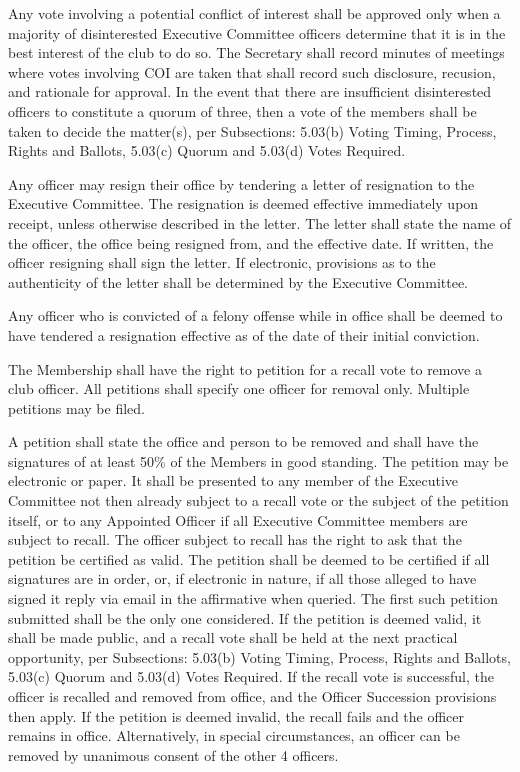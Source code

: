 \documentclass{bylaws}
\begin{document}
Any vote involving a potential conflict of interest shall be approved only when a majority of disinterested Executive Committee officers determine that it is in the best interest of the club to do so. The Secretary shall record minutes of meetings where votes involving COI are taken that shall record such disclosure, recusion, and rationale for approval. In the event that there are insufficient disinterested officers to constitute a quorum of three, then a vote of the members shall be taken to decide the matter(s), per Subsections: 5.03(b) Voting Timing, Process, Rights and Ballots, 5.03(c) Quorum and 5.03(d) Votes Required. 

Any officer may resign their office by tendering a letter of resignation to the Executive Committee. The resignation is deemed effective immediately upon receipt, unless otherwise described in the letter. The letter shall state the name of the officer, the office being resigned from, and the effective date. If written, the officer resigning shall sign the letter. If electronic, provisions as to the authenticity of the letter shall be determined by the Executive Committee. 

Any officer who is convicted of a felony offense while in office shall be deemed to have tendered a resignation effective as of the date of their initial conviction. 

The Membership shall have the right to petition for a recall vote to remove a club officer. All petitions shall specify one officer for removal only. Multiple petitions may be filed.  

A petition shall state the office and person to be removed and shall have the signatures of at least 50\% of the Members in good standing. The petition may be electronic or paper. It shall be presented to any member of the Executive Committee not then already subject to a recall vote or the subject of the petition itself, or to any Appointed Officer if all Executive Committee members are subject to recall. The officer subject to recall has the right to ask that the petition be certified as valid. The petition shall be deemed to be certified if all signatures are in order, or, if electronic in nature, if all those alleged to have signed it reply via email in the affirmative when queried. The first such petition submitted shall be the only one considered. If the petition is deemed valid, it shall be made public, and a recall vote shall be held at the next practical opportunity, per Subsections: 5.03(b) Voting Timing, Process, Rights and Ballots, 5.03(c) Quorum and 5.03(d) Votes Required. If the recall vote is successful, the officer is recalled and removed from office, and the Officer Succession provisions then apply. If the petition is deemed invalid, the recall fails and the officer remains in office. Alternatively, in special circumstances, an officer can be removed by unanimous consent of the other 4 officers. 
\end{document}

